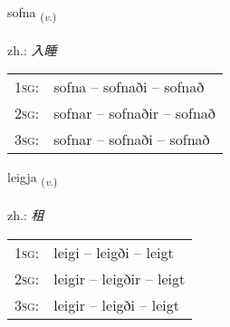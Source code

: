 \documentclass[frontgrid, backgrid]{flacards}\usepackage[]{graphicx}\usepackage[]{xcolor}
\begin{document}
\renewcommand{\flhead}{\vskip5pt \fboxsep=0pt {\small\bfseries\footnotesize Sagnorð | 动词}}
\renewcommand{\fcfoot}{\vskip5pt \fboxsep=0pt \hspace{2pt}{\small\bfseries\footnotesize 3K}}

\renewcommand{\blhead}{\vskip5pt {\small\bfseries\footnotesize Sagnorð | 动词 }}
\renewcommand{\bcfoot}{\vskip5pt \hspace{2pt}{\small\bfseries\footnotesize 3K}}


{sofna \small{\textsubscript{(\textit{v.})}} \\[1ex] %
\textphonetic{[sɔpna]} \\
zh.: \emph{入睡} \\  [2ex]
\renewcommand*{\arraystretch}{0.8}
\begin{tabular}{p{1cm}l}
\textsc{1sg}: & sofna -- sofnaði -- sofnað \\ 
\textsc{2sg}: & sofnar -- sofnaðir -- sofnað \\ 
\textsc{3sg}: & sofnar -- sofnaði -- sofnað \\ 
\end{tabular}
}

\renewcommand{\flhead}{\vskip5pt \fboxsep=0pt {\small\bfseries\footnotesize Sagnorð | 动词}}
\renewcommand{\fcfoot}{\vskip5pt \fboxsep=0pt \hspace{2pt}{\small\bfseries\footnotesize 3K}}

\renewcommand{\blhead}{\vskip5pt {\small\bfseries\footnotesize Sagnorð | 动词 }}
\renewcommand{\bcfoot}{\vskip5pt \hspace{2pt}{\small\bfseries\footnotesize 3K}}


{leigja \small{\textsubscript{(\textit{v.})}} \\[1ex] %
\textphonetic{[leija]} \\
zh.: \emph{租} \\  [2ex]
\renewcommand*{\arraystretch}{0.8}
\begin{tabular}{p{1cm}l}
\textsc{1sg}: & leigi -- leigði -- leigt \\ 
\textsc{2sg}: & leigir -- leigðir -- leigt \\ 
\textsc{3sg}: & leigir -- leigði -- leigt \\ 
\end{tabular}
}
\end{document}
